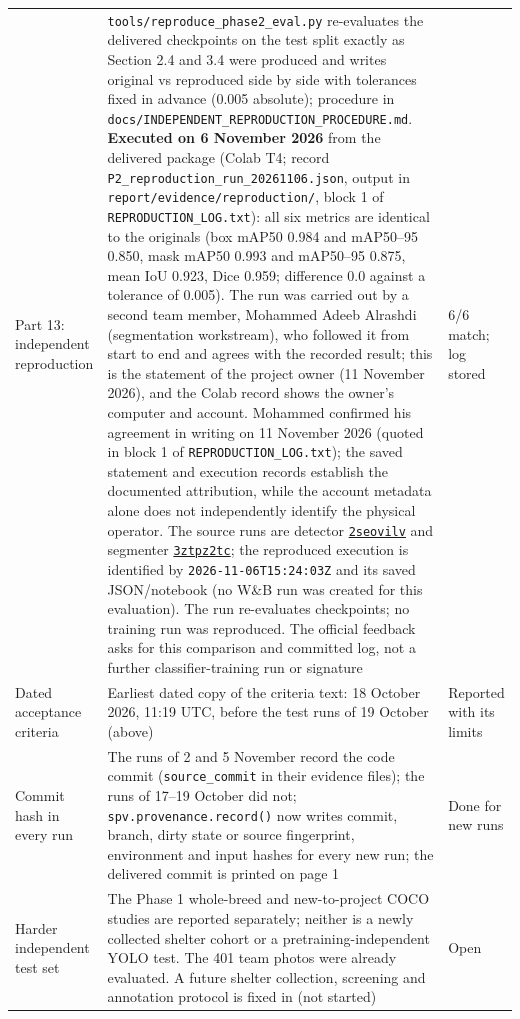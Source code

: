 \documentclass[11pt,a4paper]{article}
\newcommand{\run}[1]{\href{https://wandb.ai/yasser-alhajlah-kaust/smart-pet-vision/runs/#1}{\texttt{#1}}}
\begin{document}
{\begin{xltabular}{\linewidth}{@{}p{3.1cm} Y p{1.9cm}@{}}
Part 13: independent reproduction & \texttt{tools/reproduce\_phase2\_eval.py} re-evaluates the delivered checkpoints on the test split exactly as Section 2.4 and 3.4 were produced and writes original vs reproduced side by side with tolerances fixed in advance (0.005 absolute); procedure in \texttt{docs/INDEPENDENT\_REPRODUCTION\_PROCEDURE.md}. \textbf{Executed on 6 November 2026} from the delivered package (Colab T4; record \texttt{P2\_reproduction\_}\allowbreak\texttt{run\_20261106.json}, output in \texttt{report/evidence/reproduction/}, block 1 of \texttt{REPRODUCTION\_LOG.txt}): all six metrics are identical to the originals (box mAP50 0.984 and mAP50--95 0.850, mask mAP50 0.993 and mAP50--95 0.875, mean IoU 0.923, Dice 0.959; difference 0.0 against a tolerance of 0.005). The run was carried out by a second team member, Mohammed Adeeb Alrashdi (segmentation workstream), who followed it from start to end and agrees with the recorded result; this is the statement of the project owner (11 November 2026), and the Colab record shows the owner's computer and account. Mohammed confirmed his agreement in writing on 11 November 2026 (quoted in block 1 of \texttt{REPRODUCTION\_LOG.txt}); the saved statement and execution records establish the documented attribution, while the account metadata alone does not independently identify the physical operator. The source runs are detector \run{2seovilv} and segmenter \run{3ztpz2tc}; the reproduced execution is identified by \nolinkurl{2026-11-06T15:24:03Z} and its saved JSON/notebook (no W\&B run was created for this evaluation). The run re-evaluates checkpoints; no training run was reproduced. The official feedback asks for this comparison and committed log, not a further classifier-training run or signature & 6/6 match; log stored \\
Dated acceptance criteria & Earliest dated copy of the criteria text: 18 October 2026, 11:19 UTC, before the test runs of 19 October (above) & Reported with its limits \\
Commit hash in every run & The runs of 2 and 5 November record the code commit (\texttt{source\_commit} in their evidence files); the runs of 17--19 October did not; \texttt{spv.provenance.record()} now writes commit, branch, dirty state or source fingerprint, environment and input hashes for every new run; the delivered commit is printed on page 1 & Done for new runs \\
Harder independent test set & The Phase 1 whole-breed and new-to-project COCO studies are reported separately; neither is a newly collected shelter cohort or a pretraining-independent YOLO test. The 401 team photos were already evaluated. A future shelter collection, screening and annotation protocol is fixed in  (not started) & Open \\

\end{xltabular}}
\end{document}
